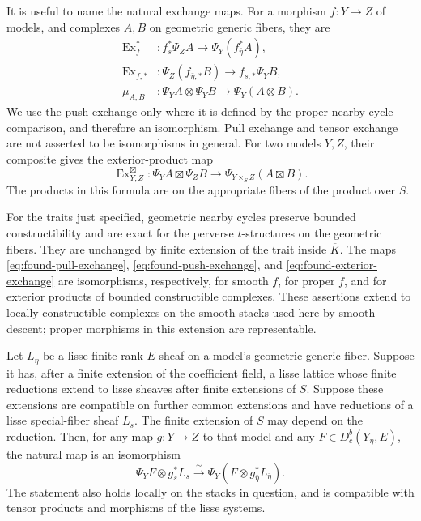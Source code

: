 It is useful to name the natural exchange maps.  For a morphism
$f:Y\to Z$ of models, and complexes $A,B$ on geometric generic fibers, they
are
\begin{align}
 \operatorname{Ex}^*_f &: f_s^*\Psi_Z A
                  \longrightarrow\Psi_Y(f_{\bar\eta}^*A),
                          \label{eq:found-pull-exchange}\\
 \operatorname{Ex}_{f,*} &: \Psi_Z(f_{\bar\eta,*}B)
                  \longrightarrow f_{s,*}\Psi_Y B,
                          \label{eq:found-push-exchange}\\
 \mu_{A,B} &: \Psi_Y A\otimes\Psi_Y B
                  \longrightarrow\Psi_Y(A\otimes B).
                          \label{eq:found-tensor-exchange}
\end{align}
We use the push exchange only where it is defined by the proper
nearby-cycle comparison, and therefore an isomorphism.  Pull exchange and
tensor exchange are not asserted to be isomorphisms in general.  For two
models $Y,Z$, their composite gives the exterior-product map
\begin{equation}\label{eq:found-exterior-exchange}
 \operatorname{Ex}^{\boxtimes}_{Y,Z}:
  \Psi_Y A\boxtimes\Psi_Z B
       \longrightarrow\Psi_{Y\times_S Z}(A\boxtimes B).
\end{equation}
The products in this formula are on the appropriate fibers of the product
over $S$.

\begin{proposition}
\label{prop:nearby-foundations}
For the traits just specified, geometric nearby cycles preserve bounded
constructibility and are exact for the perverse $t$-structures on the
geometric fibers.  They are unchanged by finite extension of the trait
inside $\overline K$.  The maps
\eqref{eq:found-pull-exchange}, \eqref{eq:found-push-exchange}, and
\eqref{eq:found-exterior-exchange} are isomorphisms, respectively, for
smooth $f$, for proper $f$, and for exterior products of bounded
constructible complexes.  These assertions extend to locally
constructible complexes on the smooth stacks used here by smooth descent;
proper morphisms in this extension are representable.

Let $L_{\bar\eta}$ be a lisse finite-rank $E$-sheaf on a model's geometric
generic fiber.  Suppose it has, after a finite extension of the coefficient
field, a lisse lattice whose finite reductions extend to lisse sheaves
after finite extensions of $S$.  Suppose these extensions are compatible
on further common extensions and have reductions of a lisse special-fiber
sheaf $L_s$.  The finite extension of $S$ may depend on the reduction.
Then, for any map $g:Y\to Z$ to that model and any
$F\in D^b_c(Y_{\bar\eta},E)$, the natural map is an isomorphism
\begin{equation}\label{eq:found-lisse-tensor}
  \Psi_Y F\otimes g_s^*L_s
       \xrightarrow{\ \sim\ }
             \Psi_Y(F\otimes g_{\bar\eta}^*L_{\bar\eta}).
\end{equation}
The statement also holds locally on the stacks in question, and is
compatible with tensor products and morphisms of the lisse systems.
\end{proposition}

